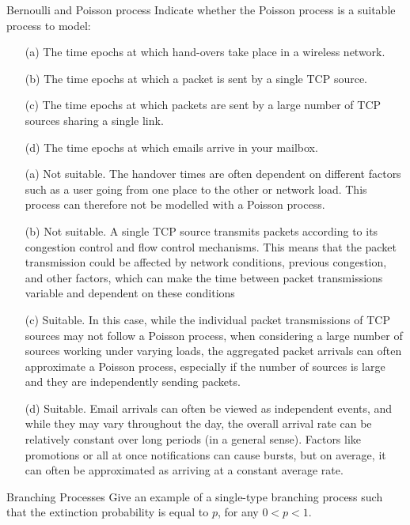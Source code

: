 \begin{problem}{Bernoulli and Poisson process}
Indicate whether the Poisson process is a suitable process to model:
\begin{itemize}
\item[(a)] The time epochs at which hand-overs take place in a wireless network.
\item[(b)] The time epochs at which a packet is sent by a single TCP source.
\item[(c)] The time epochs at which packets are sent by a large number of TCP sources sharing a single link.
\item[(d)] The time epochs at which emails arrive in your mailbox.
\end{itemize}
\end{problem}

\begin{solution}
\begin{itemize}
\item[(a)] Not suitable. The handover times are often dependent on different factors such as a user going from one place to the other or network load. This process can therefore not be modelled with a Poisson process.
\item[(b)] Not suitable. A single TCP source transmits packets according to its congestion control and flow control mechanisms. This means that the packet transmission could be affected by network conditions, previous congestion, and other factors, which can make the time between packet transmissions variable and dependent on these conditions
\item[(c)] Suitable. In this case, while the individual packet transmissions of TCP sources may not follow a Poisson process, when considering a large number of sources working under varying loads, the aggregated packet arrivals can often approximate a Poisson process, especially if the number of sources is large and they are independently sending packets.
\item[(d)] Suitable. Email arrivals can often be viewed as independent events, and while they may vary throughout the day, the overall arrival rate can be relatively constant over long periods (in a general sense). Factors like promotions or all at once notifications can cause bursts, but on average, it can often be approximated as arriving at a constant average rate.
\end{itemize}
\end{solution}

\begin{problem}{Branching Processes}
Give an example of a single-type branching process such that
the extinction probability is equal to $p$, for any $0 < p < 1$.
\end{problem}


